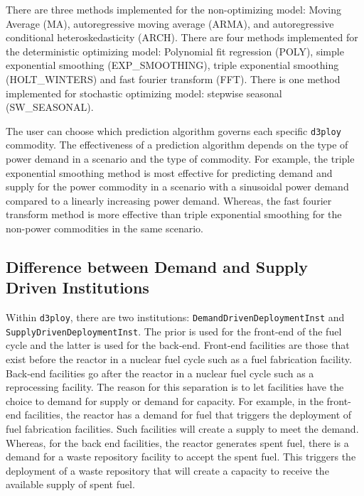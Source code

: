 \documentclass[11pt,letterpaper]{article}
\newcommand{\deploy}{\texttt{d3ploy}\xspace}%
\begin{document}
There are three methods implemented for the non-optimizing model: 
Moving Average (MA), autoregressive moving average (ARMA), and autoregressive 
conditional heteroskedasticity (ARCH).
There are four methods implemented for the deterministic optimizing model: 
Polynomial fit regression (POLY), simple exponential smoothing (EXP\_SMOOTHING),  
triple exponential smoothing (HOLT\_WINTERS) and fast fourier 
transform (FFT). 
There is one method implemented for stochastic optimizing model: 
stepwise seasonal (SW\_SEASONAL).  

The user can choose which prediction algorithm governs each specific 
\deploy commodity. 
The effectiveness of a prediction algorithm depends on the type 
of power demand in a scenario and the type of commodity. 
For example, the triple exponential smoothing method is most effective
for predicting demand and supply for the power commodity in a scenario  
with a sinusoidal power demand compared to a linearly increasing power 
demand.
Whereas, the fast fourier transform method is more effective than triple 
exponential smoothing for the non-power commodities in the same 
scenario.  

\subsection{\textbf{Difference between Demand and Supply Driven Institutions}}
Within \deploy, there are two institutions: \texttt{DemandDrivenDeploymentInst} and \texttt{SupplyDrivenDeploymentInst}. 
The prior is used for the front-end of the fuel cycle and the latter is used 
for the back-end. 
Front-end facilities are those that exist before the reactor 
in a nuclear fuel cycle such as a fuel fabrication facility. 
Back-end facilities go after the reactor in a nuclear 
fuel cycle such as a reprocessing facility. 
The reason for this separation is to let facilities have the choice 
to demand for supply or demand for capacity. 
For example, in the front-end facilities, the reactor has a demand for 
fuel that triggers the deployment of fuel fabrication facilities. Such facilities
will create a supply to meet the demand.
Whereas, for the back end facilities, the reactor generates spent fuel, 
there is a demand for a waste repository facility to accept the 
spent fuel. This triggers the deployment of a waste repository that
will create a capacity to receive the available supply of spent fuel.
\end{document}
